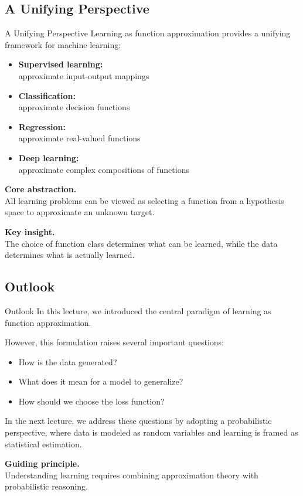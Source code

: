\documentclass[aspectratio=169,11pt]{beamer}
\begin{document}
\subsection{A Unifying Perspective}
\begin{frame}[t,allowframebreaks]{A Unifying Perspective}
\small
Learning as function approximation provides a unifying framework for machine learning:

\begin{itemize}
    \item \textbf{Supervised learning:}\\ approximate input-output mappings
    \item \textbf{Classification:}\\ approximate decision functions
    \item \textbf{Regression:}\\ approximate real-valued functions
    \item \textbf{Deep learning:}\\ approximate complex compositions of functions
\end{itemize}

\textbf{Core abstraction.}\\ All learning problems can be viewed as selecting a function from a hypothesis space to approximate an unknown target.

\textbf{Key insight.}\\ The choice of function class determines what can be learned, while the data determines what is actually learned.
\end{frame}

\subsection{Outlook}
\begin{frame}[t,allowframebreaks]{Outlook}
\small
In this lecture, we introduced the central paradigm of learning as function approximation.

However, this formulation raises several important questions:

\begin{itemize}
    \item How is the data generated?
    \item What does it mean for a model to generalize?
    \item How should we choose the loss function?
\end{itemize}

In the next lecture, we address these questions by adopting a probabilistic perspective, where data is modeled as random variables and learning is framed as statistical estimation.

\textbf{Guiding principle.}\\ Understanding learning requires combining approximation theory with probabilistic reasoning.
\end{frame}
\end{document}
